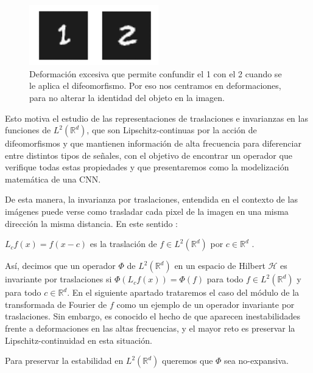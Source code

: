 \begin{figure}[!h]
  \centering
  \includegraphics[width=0.5\textwidth]{img/1_excesivamente_deformado.png}
  \caption{Deformación excesiva que permite confundir el 1 con el 2 cuando se le aplica el difeomorfismo. Por eso nos centramos en  deformaciones, para no alterar la identidad del objeto en la imagen.}
  \label{fig:deformaciones_1}
\end{figure}

\medskip


\noindent Esto motiva el estudio de las representaciones de traslaciones e invarianzas en las funciones de $L^2(\mathbb{R}^d)$, que son Lipschitz-continuas por la acción de difeomorfismos y que mantienen información de alta frecuencia para diferenciar entre distintos tipos de señales, con el objetivo de encontrar un operador que verifique todas estas propiedades y que presentaremos como la modelización matemática de una CNN.

\medskip

\noindent De esta manera, la invarianza por traslaciones, entendida en el contexto de las imágenes puede verse como trasladar cada pixel de la imagen en una misma dirección la misma distancia. En este sentido : 

\begin{definicion}
$L_cf(x)=f(x-c)$ es la traslación de $f \in L^2(\mathbb{R}^d)$ por $c \in \mathbb{R}^d$ .
\end{definicion}

\noindent Así, decimos que un operador $\Phi$ de  $L^2(\mathbb{R}^d)$ en un espacio de Hilbert $\mathcal{H}$ es invariante por traslaciones si $\Phi(L_cf(x))=\Phi(f)$ para todo $f \in L^2(\mathbb{R}^d)$ y para todo $c \in \mathbb{R}^d$. En el siguiente apartado trataremos el caso del módulo de la transformada de Fourier de $f$ como un ejemplo de un operador invariante por traslaciones. Sin embargo, es conocido el hecho de que aparecen inestabilidades frente a deformaciones en las altas frecuencias, y el mayor reto es preservar la Lipschitz-continuidad en esta situación.

\medskip

\noindent Para preservar la estabilidad en $L^2(\mathbb{R}^d)$ queremos que $\Phi$ sea no-expansiva. 

